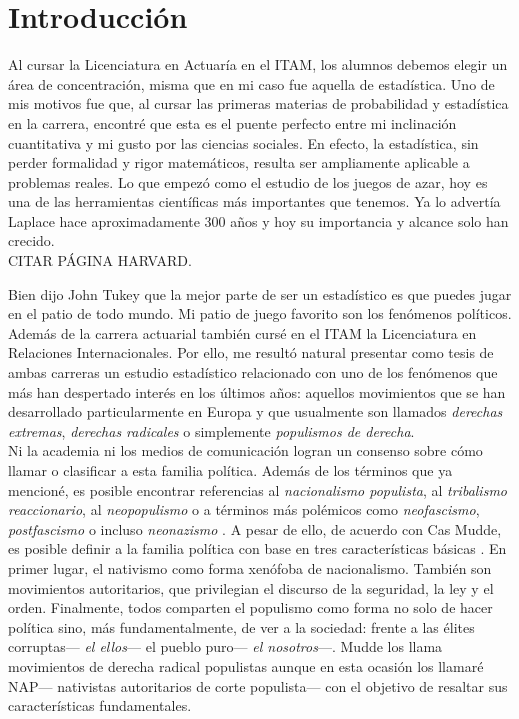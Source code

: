\chapter*{Introducción}

Al cursar la Licenciatura en Actuaría en el ITAM, los alumnos debemos elegir un área de concentración, misma que en mi caso fue aquella de estadística. Uno de mis motivos fue que, al cursar las primeras materias de probabilidad y estadística en la carrera, encontré que esta es el puente perfecto entre mi inclinación cuantitativa y mi gusto por las ciencias sociales. En efecto, la estadística, sin perder formalidad y rigor matemáticos, resulta ser ampliamente aplicable a problemas reales. Lo que empezó como el estudio de los juegos de azar, hoy es una de las herramientas científicas más importantes que tenemos. Ya lo advertía Laplace hace aproximadamente 300 años y hoy su importancia y alcance solo han crecido.\\ 

{\color{Red} CITAR PÁGINA HARVARD}.

Bien dijo John Tukey que la mejor parte de ser un estadístico es que puedes jugar en el patio de todo mundo. Mi patio de juego favorito son los fenómenos políticos. Además de la carrera actuarial también cursé en el ITAM la Licenciatura en Relaciones Internacionales. Por ello, me resultó natural presentar como tesis de ambas carreras un estudio estadístico relacionado con uno de los fenómenos que más han despertado interés en los últimos años: aquellos movimientos que se han desarrollado particularmente en Europa y que usualmente son llamados \textit{derechas extremas}, \textit{derechas radicales} o simplemente \textit{populismos de derecha}.\\ 

Ni la academia ni los medios de comunicación logran un consenso sobre cómo llamar o clasificar a esta familia política. Además de los términos que ya mencioné, es posible encontrar referencias al \textit{nacionalismo populista}, al \textit{tribalismo reaccionario}, al \textit{neopopulismo} o a términos más polémicos como \textit{neofascismo}, \textit{postfascismo} o incluso \textit{neonazismo} \parencites{Mudde07a}{Mammone12}{Hainsworth16a}. A pesar de ello, de acuerdo con Cas Mudde, es posible definir a la familia política con base en tres características básicas \parencites{Mudde07a}{Beauchamp16a}. En primer lugar, el nativismo como forma xenófoba de nacionalismo. También son movimientos autoritarios, que privilegian el discurso de la seguridad, la ley y el orden. Finalmente, todos
comparten el populismo como forma no solo de hacer política sino, más fundamentalmente, de ver a la sociedad: frente a las élites corruptas--- \textit{el ellos}--- el pueblo puro--- \textit{el nosotros}---. Mudde los llama movimientos de derecha radical populistas aunque en esta ocasión los llamaré NAP--- nativistas autoritarios de corte populista--- con el objetivo de resaltar sus características fundamentales.\\

